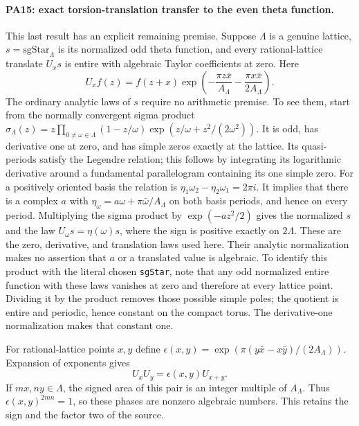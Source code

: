 \paragraph{PA15: exact torsion-translation transfer to the even theta function.}
This last result has an explicit remaining premise. Suppose
$\Lambda$ is a genuine lattice, $s=\mathrm{sgStar}_\Lambda$
is its normalized odd theta function, and every rational-lattice
translate $U_xs$ is entire with algebraic Taylor coefficients at
zero. Here
\[
 U_xf(z)=f(z+x)\exp\!\left(-\frac{\pi z\bar x}{A_\Lambda}
                         -\frac{\pi x\bar x}{2A_\Lambda}\right).
                                                               \tag{PA.29}
\]
The ordinary analytic laws of $s$ require no arithmetic premise.
To see them, start from the normally convergent sigma product
$\sigma_\Lambda(z)=z\prod_{0\ne\omega\in\Lambda}
 (1-z/\omega)\exp(z/\omega+z^2/(2\omega^2))$.
It is odd, has derivative one at zero, and has simple zeros
exactly at the lattice. Its quasi-periods satisfy the Legendre
relation; this follows by integrating its logarithmic derivative
around a fundamental parallelogram containing its one simple
zero. For a positively oriented basis the relation is
$\eta_1\omega_2-\eta_2\omega_1=2\pi i$. It implies that there
is a complex $a$ with
$\eta_\omega=a\omega+\pi\bar\omega/A_\Lambda$ on both basis
periods, and hence on every period. Multiplying the sigma
product by $\exp(-az^2/2)$ gives the normalized $s$ and the
law $U_\omega s=\eta(\omega)s$, where the sign is positive
exactly on $2\Lambda$. These are the zero, derivative, and
translation laws used here. Their analytic normalization makes
no assertion that $a$ or a translated value is algebraic.
To identify this product with the literal chosen \texttt{sgStar},
note that any odd normalized entire function with these laws
vanishes at zero and therefore at every lattice point. Dividing
it by the product removes those possible simple poles; the
quotient is entire and periodic, hence constant on the compact
torus. The derivative-one normalization makes that constant one.

For rational-lattice points $x,y$ define
$\epsilon(x,y)=\exp(\pi(y\bar x-x\bar y)/(2A_\Lambda))$.
Expansion of exponents gives
\[
 U_xU_y=\epsilon(x,y)U_{x+y}.                                  \tag{PA.30}
\]
If $mx,ny\in\Lambda$, the signed area of this pair is an
integer multiple of $A_\Lambda$. Thus
$\epsilon(x,y)^{2mn}=1$, so these phases are nonzero algebraic
numbers. This retains the sign and the factor two of the source.

